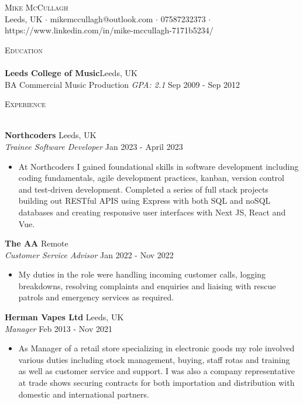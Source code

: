 \documentclass[a4paper]{article}
\newcommand{\lineunder} {
    \vspace*{-8pt} \\
    \hspace*{-18pt} \hrulefill \\
}
\newcommand{\header} [1] {
    {\hspace*{-18pt}\vspace*{6pt} \textsc{#1}}
    \vspace*{-6pt} \lineunder
}
\begin{document}
\vspace*{-40pt}

    

\vspace*{-10pt}
\begin{center}
	{\Huge \scshape {Mike McCullagh}}\\
	Leeds, UK $\cdot$ mikemccullagh@outlook.com $\cdot$ 07587232373 $\cdot$ https://www.linkedin.com/in/mike-mccullagh-7171b5234/\\
\end{center}

\header{Education}
\textbf{Leeds College of Music}\hfill Leeds, UK\\
BA Commercial Music Production \textit{GPA: 2.1} \hfill Sep 2009 - Sep 2012\\
\vspace{2mm}

\header{Experience}
\vspace{1mm}

\textbf{Northcoders} \hfill Leeds, UK\\
\textit{Trainee Software Developer} \hfill Jan 2023 - April 2023\\
\vspace{-1mm}
\begin{itemize} \itemsep 1pt
	\item At Northcoders I gained foundational skills in software development including coding fundamentals, agile development practices, kanban, version control and test-driven development. Completed a series of full stack projects building out RESTful APIS using Express with both SQL and noSQL databases and creating responsive user interfaces with Next JS, React and Vue.
\end{itemize}
\textbf{The AA} \hfill Remote\\
\textit{Customer Service Advisor} \hfill Jan 2022 - Nov 2022\\
\vspace{-1mm}
\begin{itemize} \itemsep 1pt
	\item My duties in the role were handling incoming customer calls, logging breakdowns, resolving complaints and enquiries and liaising with rescue patrols and emergency services as required.
\end{itemize}
\textbf{Herman Vapes Ltd} \hfill Leeds, UK\\
\textit{Manager} \hfill Feb 2013 - Nov 2021\\
\vspace{-1mm}
\begin{itemize} \itemsep 1pt
	\item As Manager of a retail store specializing in electronic goods my role involved various duties including stock management, buying, staff rotas and training as well as customer service and support. I was also a company representative at trade shows securing contracts for both importation and distribution with domestic and international partners.
\end{itemize}
\end{document}
